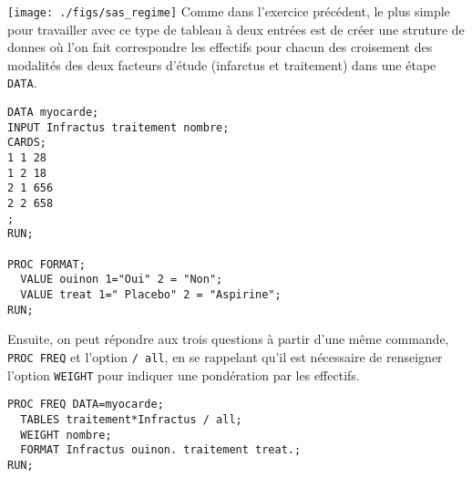 \texttt{[image: ./figs/sas\_regime]}
%
%
%
\soln{\ref{exo:9.4}}
Comme dans l'exercice précédent, le plus simple pour travailler avec ce type
de tableau à deux entrées est de créer une struture de donnes où l'on fait
correspondre les effectifs pour chacun des croisement des modalités des deux
facteurs d'étude (infarctus et traitement) dans une étape \texttt{DATA}.
\begin{verbatim}
DATA myocarde;
INPUT Infractus traitement nombre;
CARDS;
1 1 28
1 2 18
2 1 656
2 2 658
;
RUN;

PROC FORMAT; 
  VALUE ouinon 1="Oui" 2 = "Non";
  VALUE treat 1=" Placebo" 2 = "Aspirine";
RUN;
\end{verbatim}

Ensuite, on peut répondre aux trois questions à partir d'une même commande,
\texttt{PROC FREQ} et l'option \texttt{/ all}, en se rappelant qu'il est
nécessaire de renseigner l'option \texttt{WEIGHT} pour indiquer une
pondération par les effectifs.
\begin{verbatim}
PROC FREQ DATA=myocarde;
  TABLES traitement*Infractus / all;
  WEIGHT nombre;
  FORMAT Infractus ouinon. traitement treat.;
RUN;
\end{verbatim}

